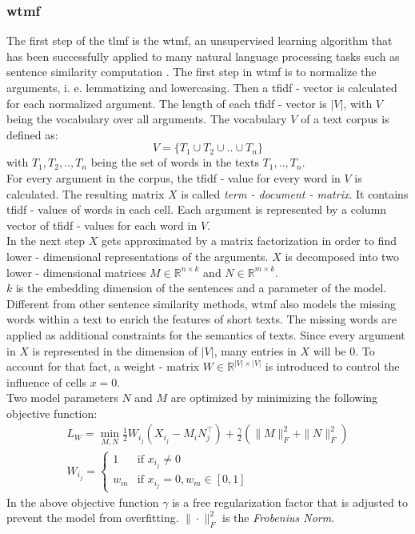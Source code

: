 \subsubsection{\acrfull{wtmf}}
The first step of the \acrshort{tlmf} is the \acrshort{wtmf}, an unsupervised learning algorithm that has been successfully applied to many natural language processing tasks such as sentence similarity computation \cite{guo2012modeling}. 
The first step in \acrshort{wtmf} is to normalize the arguments, i. e. lemmatizing and lowercasing.
Then a \acrshort{tfidf} - vector is calculated for each normalized argument.
The length of each \acrshort{tfidf} - vector is $|V|$, with $V$ being the vocabulary over all arguments.
The vocabulary $V$ of a text corpus is defined as:
    \begin{equation}
        V = \{T_1 \cup T_2 \cup .. \cup T_n\}    
    \end{equation}
with $T_1, T_2, .., T_n$ being the set of words in the texts $T_1, .., T_n$.\\
For every argument in the corpus, the \acrshort{tfidf} - value for every word in $V$ is calculated. 
The resulting matrix $X$ is called \textit{term - document - matrix}. It contains \acrshort{tfidf} - values of words in each cell. Each argument is represented by a column vector of \acrshort{tfidf} - values for each word in $V$.\\
In the next step $X$ gets approximated by a matrix factorization in order to find lower - dimensional representations of the arguments. $X$ is decomposed into two lower - dimensional matrices $M \in \mathbb{R}^{n \times k}$ and $N \in \mathbb{R}^{m \times k}$.\\ $k$ is the embedding dimension of the sentences and a parameter of the model.
Different from other sentence similarity methods, \acrshort{wtmf} also models the missing words within a text to enrich the features of short texts. The missing words are applied as additional constraints for the semantics of texts.
Since every argument in $X$ is represented in the dimension of $|V|$, many entries in $X$ will be $0$. To account for that fact, a weight - matrix $W  \in \mathbb{R}^{|V| \times |V|}$ 
is introduced to control the influence of cells $x = 0$.\\
Two model parameters $N$ and $M$ are optimized by minimizing the following objective function:
\begin{equation}
\begin{align*}
    L_W = \min_{M,N} \frac{1}{2} W_i_j (X_i_j - M_iN_j^\top) + \frac{\gamma}{2}(\|M\|^2_F + \|N\|^2_F) \\
    W_i_j = \left\{
	\begin{array}{ll}
		1  & \mbox{if } x_i_j \neq 0 \\
		w_m & \mbox{if } x_i_j = 0, w_m \in [0,1]
	\end{array}
\right.
\end{align*}
\end{equation}
In the above objective function $\gamma$ is a free regularization factor that is adjusted to prevent the model from overfitting. $\|\cdot\|^2_F$ is the \textit{Frobenius Norm}.\\

